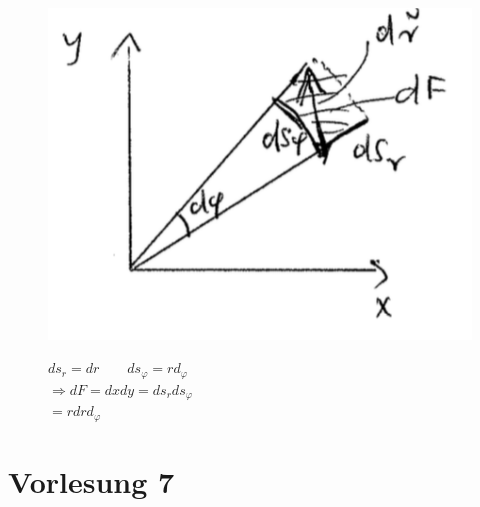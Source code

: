 \documentclass[11pt]{article}
\begin{document}
								\begin{figure}[htbp]
									\begin{minipage}[t]{10cm}
										\vspace{0pt}
										\centering
										\includegraphics[scale=0.5]{screenshot002.png}
									\end{minipage}
									\hfill
									\begin{minipage}[t]{10cm}
										\vspace{0pt}
										$ ds_r = dr \qquad ds_\varphi = r d_\varphi $\\
										$ \Rightarrow dF = dxdy = ds_r ds_\varphi $\\
										$ = rdrd_\varphi $
									\end{minipage}
								\end{figure}
							\part{Vorlesung 7}
\end{document}
